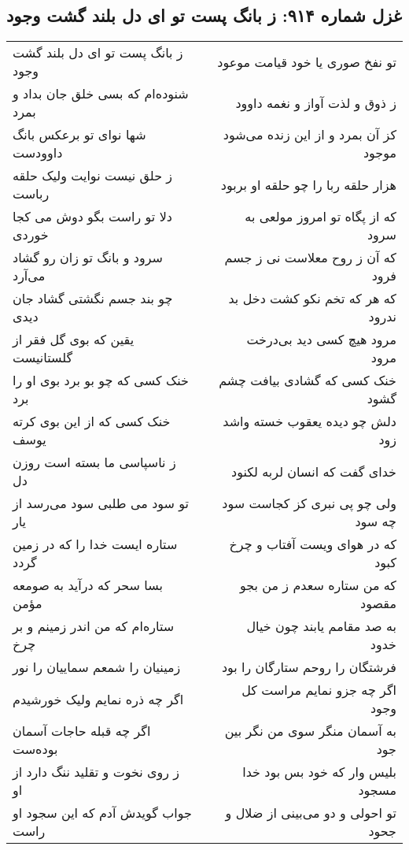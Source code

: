 \begin{center}
\section*{غزل شماره ۹۱۴: ز بانگ پست تو ای دل بلند گشت وجود}
\label{sec:0914}
\begin{longtable}{l p{0.5cm} r}
ز بانگ پست تو ای دل بلند گشت وجود
&&
تو نفخ صوری یا خود قیامت موعود
\\
شنوده‌ام که بسی خلق جان بداد و بمرد
&&
ز ذوق و لذت آواز و نغمه داوود
\\
شها نوای تو برعکس بانگ داوودست
&&
کز آن بمرد و از این زنده می‌شود موجود
\\
ز حلق نیست نوایت ولیک حلقه رباست
&&
هزار حلقه ربا را چو حلقه او بربود
\\
دلا تو راست بگو دوش می کجا خوردی
&&
که از پگاه تو امروز مولعی به سرود
\\
سرود و بانگ تو زان رو گشاد می‌آرد
&&
که آن ز روح معلاست نی ز جسم فرود
\\
چو بند جسم نگشتی گشاد جان دیدی
&&
که هر که تخم نکو کشت دخل بد ندرود
\\
یقین که بوی گل فقر از گلستانیست
&&
مرود هیچ کسی دید بی‌درخت مرود
\\
خنک کسی که چو بو برد بوی او را برد
&&
خنک کسی که گشادی بیافت چشم گشود
\\
خنک کسی که از این بوی کرته یوسف
&&
دلش چو دیده یعقوب خسته واشد زود
\\
ز ناسپاسی ما بسته است روزن دل
&&
خدای گفت که انسان لربه لکنود
\\
تو سود می طلبی سود می‌رسد از یار
&&
ولی چو پی نبری کز کجاست سود چه سود
\\
ستاره ایست خدا را که در زمین گردد
&&
که در هوای ویست آفتاب و چرخ کبود
\\
بسا سحر که درآید به صومعه مؤمن
&&
که من ستاره سعدم ز من بجو مقصود
\\
ستاره‌ام که من اندر زمینم و بر چرخ
&&
به صد مقامم یابند چون خیال خدود
\\
زمینیان را شمعم سماییان را نور
&&
فرشتگان را روحم ستارگان را بود
\\
اگر چه ذره نمایم ولیک خورشیدم
&&
اگر چه جزو نمایم مراست کل وجود
\\
اگر چه قبله حاجات آسمان بوده‌ست
&&
به آسمان منگر سوی من نگر بین جود
\\
ز روی نخوت و تقلید ننگ دارد از او
&&
بلیس وار که خود بس بود خدا مسجود
\\
جواب گویدش آدم که این سجود او راست
&&
تو احولی و دو می‌بینی از ضلال و جحود

\end{longtable}
\end{center}
